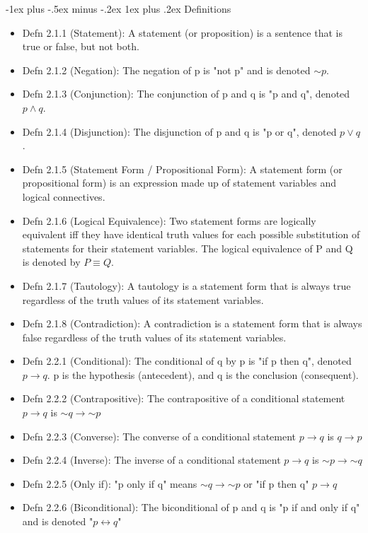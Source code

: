 \documentclass[10pt, portrait]{article}
\makeatletter
\renewcommand{\subsection}{\@startsection{subsection}{3}{0mm}%
                                {-1ex plus -.5ex minus -.2ex}%
                                {1ex plus .2ex}%
                                {\normalfont\small\bfseries}}%
\renewcommand{\lnot}{\mathord{\sim}}
\makeatother
\begin{document}
\begin{multicols*}{2}
\subsection{Definitions}
\begin{itemize}
    \item Defn 2.1.1 (Statement): A statement (or proposition) is a sentence that is true or false, but not both.
    \item Defn 2.1.2 (Negation): The negation of p is "not p" and is denoted $\lnot p$.
    \item Defn 2.1.3 (Conjunction): The conjunction of p and q is "p and q", denoted $p \land q$.
    \item Defn 2.1.4 (Disjunction): The disjunction of p and q is "p or q", denoted $p \lor q$.
    \item Defn 2.1.5 (Statement Form / Propositional Form): A statement form (or propositional form) is an expression made up of statement variables and logical connectives.
    \item Defn 2.1.6 (Logical Equivalence): Two statement forms are logically equivalent iff they have identical truth values for each possible substitution of statements for their statement variables. The logical equivalence of P and Q is denoted by $P \equiv Q$.
    \item Defn 2.1.7 (Tautology): A tautology is a statement form that is always true regardless of the truth values of its statement variables.
    \item Defn 2.1.8 (Contradiction): A contradiction is a statement form that is always false regardless of the truth values of its statement variables.
    \item Defn 2.2.1 (Conditional): The conditional of q by p is "if p then q", denoted $p \rightarrow q$. p is the hypothesis (antecedent), and q is the conclusion (consequent).
    \item Defn 2.2.2 (Contrapositive): The contrapositive of a conditional statement $p \rightarrow q$ is $\lnot q \rightarrow \lnot p$
    \item Defn 2.2.3 (Converse): The converse of a conditional statement $p \rightarrow q$ is $q \rightarrow p$ 
    \item Defn 2.2.4 (Inverse): The inverse of a conditional statement $p \rightarrow q$ is $\lnot p \rightarrow \lnot q$ 
    \item Defn 2.2.5 (Only if): "p only if q" means $\lnot q \rightarrow \lnot p$ or "if p then q" $p \rightarrow q$
    \item Defn 2.2.6 (Biconditional): The biconditional of p and q is "p if and only if q" and is denoted "$p \leftrightarrow q$"

\end{itemize}
\end{multicols*}
\end{document}
